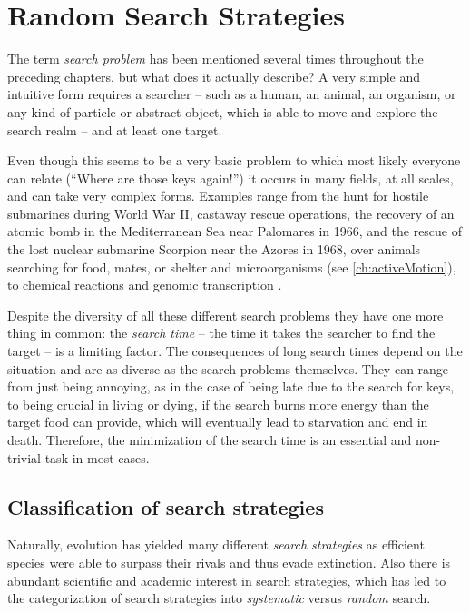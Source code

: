 \chapter{Random Search Strategies}\label{ch:randomSearchStrategies}
The term \emph{search problem} has been mentioned several times throughout the preceding chapters, but what does it actually describe? A very simple and intuitive form requires a searcher -- such as a human, an animal, an organism, or any kind of particle or abstract object, which is able to move and explore the search realm -- and at least one target.

Even though this seems to be a very basic problem to which most likely everyone can relate (``Where are those keys again!'') it occurs in many fields, at all scales, and can take very complex forms. Examples range from the hunt for hostile submarines during World War II, castaway rescue operations, the recovery of an atomic bomb in the Mediterranean Sea near Palomares in 1966, and the rescue of the lost nuclear submarine Scorpion near the Azores in 1968, over animals searching for food, mates, or shelter and microorganisms (see \autoref{ch:activeMotion}), to chemical reactions and genomic transcription \cite{benichou:2011}.

Despite the diversity of all these different search problems they have one more thing in common: the \textit{search time} -- the time it takes the searcher to find the target -- is a limiting factor. The consequences of long search times depend on the situation and are as diverse as the search problems themselves. They can range from just being annoying, as in the case of being late due to the search for keys, to being crucial in living or dying, if \eg the search burns more energy than the target food can provide, which will eventually lead to starvation and end in death. Therefore, the minimization of the search time is an essential and non-trivial task in most cases.

\section{Classification of search strategies}\label{sec:class-search-strategies}
Naturally, evolution has yielded many different \textit{search strategies} as efficient species were able to surpass their rivals and thus evade extinction. Also there is abundant scientific and academic interest in search strategies, which has led to the categorization of search strategies into \textit{systematic} versus \textit{random} search.

